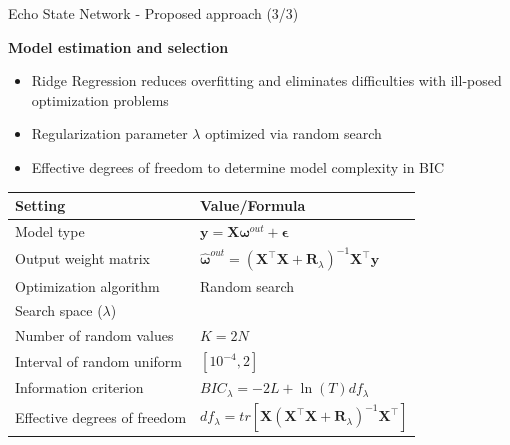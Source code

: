 \documentclass[aspectratio=169]{beamer}
\begin{document}
\begin{frame}[t]{Echo State Network - Proposed approach (3/3)}
    \begin{minipage}[t]{0.3\textwidth}
        \vspace{0pt}
        \textbf{Model estimation and selection}
        \begin{itemize}
        	\item Ridge Regression reduces overfitting and eliminates difficulties with ill-posed optimization problems
        	\item Regularization parameter $\lambda$ optimized via random search
        	\item Effective degrees of freedom to determine model complexity in BIC
        \end{itemize}
    \end{minipage}%
    \hfill
    \begin{minipage}[t]{0.7\textwidth}
        \vspace{0pt}
        	\begin{table}[ht]
        	\scriptsize
			\centering
				\begin{tabular}{ll}
				\toprule
				\textbf{Setting}                          & \textbf{Value/Formula}	 \\
				\midrule
				Model type                                & $\mathbf{y} = \mathbf{X} \boldsymbol{\omega}^{out} + \boldsymbol{\epsilon}$	 \\
				Output weight matrix                      & $\boldsymbol{\hat{\omega}}^{out} = (\mathbf{X}^\top \mathbf{X} + \mathbf{R}_{\lambda})^{-1}\mathbf{X}^\top\mathbf{y}$ \\
				Optimization algorithm                    & Random search 	 \\
				Search space ($\lambda$)                  &  				 \\
				\hspace{2.5mm} Number of random values    & $K = 2N$             \\
				\hspace{2.5mm} Interval of random uniform & $[10^{-4}, 2]$   \\
				Information criterion                     & $BIC_{\lambda} = -2 L + \ln(T) df_{\lambda}$ \\
				Effective degrees of freedom	          & $df_{\lambda} = tr[{\mathbf{X}{{({\mathbf{X}^{\top}\mathbf{X} + \mathbf{R}_{\lambda}})}^{ - 1}}\mathbf{X}^{\top}}]$ \\
				\bottomrule
				\end{tabular}
			\end{table}
    \end{minipage}
\end{frame}
\end{document}
